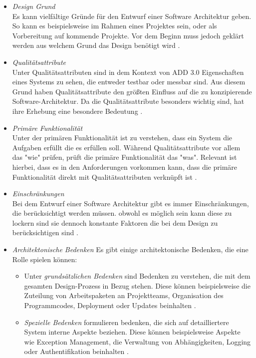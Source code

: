 \begin{itemize}
\item \emph{Design Grund} \\
Es kann vielf\"altige Gr\"unde f\"ur den Entwurf einer Software Architektur geben. So kann es beispielsweise im Rahmen eines Projektes sein, oder als Vorbereitung auf kommende Projekte. Vor dem Beginn muss jedoch gekl\"art werden aus welchem Grund das Design ben\"otigt wird \cite{Cer01}.
\item \emph{Qualit\"atsattribute} \\
Unter Qualit\"atsattributen sind in dem Kontext von ADD 3.0 Eigenschaften eines Systems zu sehen, die entweder testbar oder messbar sind. Aus diesem Grund haben Qualit\"atsattribute den gr\"o\ss{}ten Einfluss auf die zu konzipierende Software-Architektur. Da die Qualit\"atsattribute besonders wichtig sind, hat ihre Erhebung eine besondere Bedeutung \cite{Cer01}.
\item \emph{Prim\"are Funktionalit\"at} \\
Unter der prim\"aren Funktionalit\"at ist zu verstehen, dass ein System die Aufgaben erf\"ullt die es erf\"ullen soll. W\"ahrend Qualit\"atsattribute vor allem das "wie" pr\"ufen, pr\"uft die prim\"are Funktionalit\"at das "was". Relevant ist hierbei, dass es in den Anforderungen vorkommen kann, dass die prim\"are Funktionalit\"at direkt mit Qualit\"atsattributen verkn\"upft ist \cite{Cer01}. 
\item \emph{Einschr\"ankungen} \\
Bei dem Entwurf einer Software Architektur gibt es immer Einschr\"ankungen, die ber\"ucksichtigt werden m\"ussen. obwohl es m\"oglich sein kann diese zu lockern sind sie dennoch konstante Faktoren die bei dem Design zu ber\"ucksichtigen sind \cite{Cer01}.
\item \emph{Architektonische Bedenken} Es gibt einige architektonische Bedenken, die eine Rolle spielen k\"onnen:
\begin{itemize}
\item Unter \emph{grunds\"atzlichen Bedenken} sind Bedenken zu verstehen, die mit dem gesamten Design-Prozess in Bezug stehen. Diese k\"onnen beispielsweise die Zuteilung von Arbeitspaketen an Projektteams, Organisation des Programmcodes, Deployment oder Updates beinhalten \cite{Cer01}.
\item \emph{Spezielle Bedenken} formulieren bedenken, die sich auf detailliertere System interne Aspekte beziehen. Diese k\"onnen beispielsweise Aspekte wie Exception Management, die Verwaltung von Abh\"angigkeiten, Logging oder Authentifikation beinhalten \cite{Cer01}.

\end{itemize}
\end{itemize}
